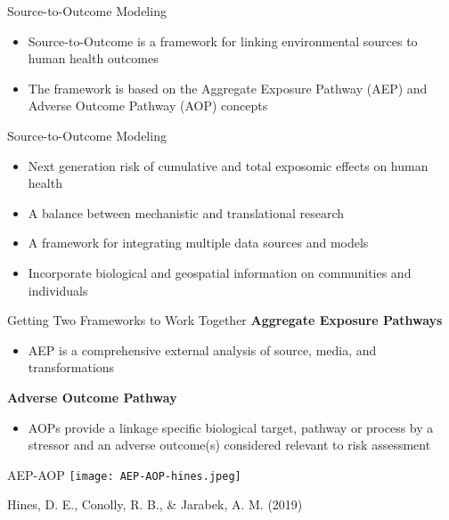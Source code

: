 \documentclass[
  ignorenonframetext,
]{beamer}
\providecommand{\tightlist}{%
  \setlength{\itemsep}{0pt}\setlength{\parskip}{0pt}}\usepackage{longtable,booktabs,array}
\begin{document}
\begin{frame}{Source-to-Outcome Modeling}
\label{source-to-outcome-modeling-1}
\begin{itemize}
\item
  Source-to-Outcome is a framework for linking environmental sources to
  human health outcomes
\item
  The framework is based on the Aggregate Exposure Pathway (AEP) and
  Adverse Outcome Pathway (AOP) concepts
\end{itemize}
\end{frame}

\begin{frame}{Source-to-Outcome Modeling}
\label{source-to-outcome-modeling-2}
\begin{itemize}
\tightlist
\item
  Next generation risk of cumulative and total exposomic effects on
  human health
\item
  A balance between mechanistic and translational research
\item
  A framework for integrating multiple data sources and models
\item
  Incorporate biological and geospatial information on communities and
  individuals
\end{itemize}
\end{frame}

\begin{frame}{Getting Two Frameworks to Work Together}
\label{getting-two-frameworks-to-work-together}
\textbf{Aggregate Exposure Pathways}

\begin{itemize}
\tightlist
\item
  AEP is a comprehensive external analysis of source, media, and
  transformations
\end{itemize}

\textbf{Adverse Outcome Pathway}

\begin{itemize}
\tightlist
\item
  AOPs provide a linkage specific biological target, pathway or process
  by a stressor and an adverse outcome(s) considered relevant to risk
  assessment
\end{itemize}
\end{frame}

\begin{frame}{AEP-AOP}
\label{aep-aop}
\texttt{[image: AEP-AOP-hines.jpeg]}

Hines, D. E., Conolly, R. B., \& Jarabek, A. M. (2019)
\end{frame}
\end{document}
